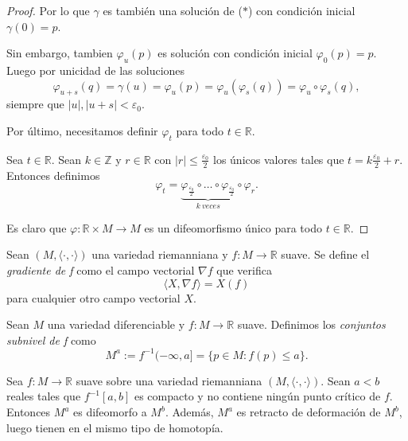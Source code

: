 \begin{proof}
    Por lo que $\gamma$ es también una solución de ($\ast$) con condición inicial $\gamma(0)=p$.

    Sin embargo, tambien $\varphi_u(p)$ es solución con condición inicial $\varphi_0(p)=p$. Luego por unicidad de las soluciones
    \begin{equation*}
        \varphi_{u+s}(q)=\gamma(u)=\varphi_u(p)=\varphi_u(\varphi_s(q))=\varphi_u\circ \varphi_s(q),
    \end{equation*}
    siempre que $|u|, |u+s|<\varepsilon_0$.

    Por último, necesitamos definir $\varphi_t$ para todo $t\in \mathbb{R}$.

    Sea $t\in \mathbb{R}$. Sean $k\in \mathbb{Z}$ y $r\in \mathbb{R}$ con $|r|\le \frac{\varepsilon_0}{2}$ los únicos valores tales que $t=k\frac{\varepsilon_0}{2}+r$. Entonces definimos
    \begin{equation*}
        \varphi_t=\underbrace{\varphi_{\frac{\varepsilon_0}{2}}\circ \dots \circ \varphi_{\frac{\varepsilon_0}{2}}}_{k~veces}\circ \varphi_r.
    \end{equation*}

    Es claro que $\varphi:\mathbb{R}\times M\to M$ es un difeomorfismo único para todo $t\in \mathbb{R}$.

\end{proof}

\begin{definition}
    Sean $(M,\langle\cdot,\cdot\rangle)$ una variedad riemanniana y $f:M\to\mathbb{R}$ suave. Se define el \textit{gradiente de f} como el campo vectorial $\nabla f$ que verifica 
    \begin{equation*}
        \langle X,\nabla f\rangle = X(f)
    \end{equation*}
    para cualquier otro campo vectorial $X$.
\end{definition}
\bigskip

\begin{definition}
    Sean $M$ una variedad diferenciable y $f:M\to\mathbb{R}$ suave. Definimos los \textit{conjuntos subnivel de f} como
    \begin{equation*}
        M^a := f^{-1}(-\infty,a] =\{p\in M: f(p)\le a\}.
    \end{equation*}
\end{definition}

\begin{theorem}
\label{retractodef}
    Sea $f:M\to\mathbb{R}$ suave sobre una variedad riemanniana $(M,\langle\cdot,\cdot\rangle)$. Sean $a<b$ reales tales que $f^{-1}[a,b]$ es compacto y no contiene ningún punto crítico de $f$. Entonces $M^a$ es difeomorfo a $M^b$. Además, $M^a$ es retracto de deformación de $M^b$, luego tienen en el mismo tipo de homotopía.
\end{theorem}

